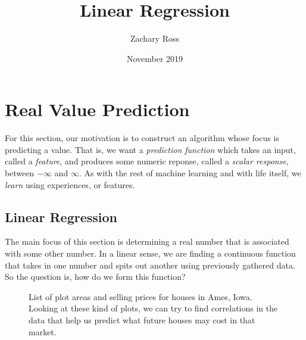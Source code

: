 \documentclass{book}[a5paper]
\title{Linear Regression}
\author{Zachary Ross}
\date{November 2019}
\begin{document}
\section{Real Value Prediction}

For this section, our motivation is to construct an algorithm whose focus is
predicting a value. That is, we want a \emph{prediction function} which takes an
input, called a \emph{feature}, and produces some numeric reponse, called a
\emph{scalar response}, between $-\infty$ and $\infty$. As with the rest of
machine learning and with life itself, we \emph{learn} using experiences, or
features.


\subsection{Linear Regression}


The main focus of this section is determining a real number
that is associated with some other number. In a linear sense, we are finding
a continuous function that takes in one number and spits out another using
previously gathered data. So the question is, how do we form this function?


\begin{figure}[t!]
\centering
    \caption{List of plot areas and selling prices for houses in Ames, Iowa.
    Looking at these kind of plots, we can try to find correlations in the data
    that help us predict what future houses may cost in that market.}
    \label{fig:hp}
\end{figure}
\end{document}
